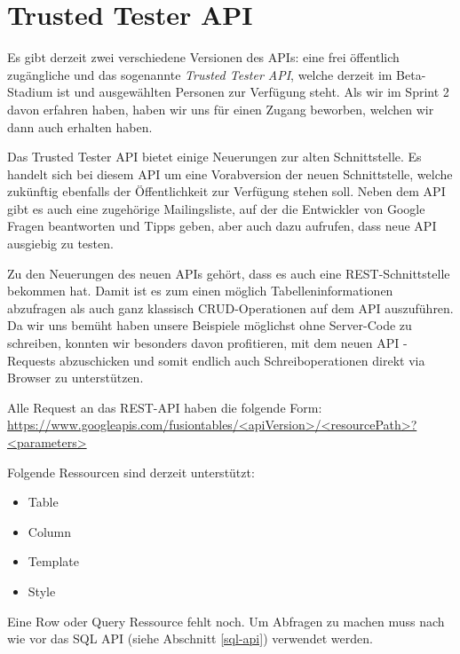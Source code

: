 \section{Trusted Tester API}
\label{trusted-tester-api}
Es gibt derzeit zwei verschiedene Versionen des APIs: eine frei öffentlich zugängliche und das sogenannte \emph{Trusted Tester API}, welche derzeit im Beta-Stadium ist und ausgewählten Personen zur Verfügung steht. Als wir im Sprint 2 davon erfahren haben, haben wir uns für einen Zugang beworben, welchen wir dann auch erhalten haben.

Das Trusted Tester API bietet einige Neuerungen zur alten Schnittstelle. Es handelt sich bei diesem API um eine Vorabversion der neuen Schnittstelle, welche zukünftig ebenfalls der Öffentlichkeit zur Verfügung stehen soll. Neben dem API gibt es auch eine zugehörige Mailingsliste, auf der die Entwickler von Google Fragen beantworten und Tipps geben, aber auch dazu aufrufen, dass neue API ausgiebig zu testen.

Zu den Neuerungen des neuen APIs gehört, dass es auch eine \gls{REST}-Schnittstelle bekommen hat. Damit ist es zum einen möglich Tabelleninformationen abzufragen als auch ganz klassisch CRUD-Operationen auf dem API auszuführen. Da wir uns bemüht haben unsere Beispiele möglichst ohne Server-Code zu schreiben, konnten wir besonders davon profitieren, mit dem neuen API -Requests abzuschicken und somit endlich auch Schreiboperationen direkt via Browser zu unterstützen. 

Alle Request an das \gls{REST}-API haben die folgende Form: \\
\url{https://www.googleapis.com/fusiontables/<apiVersion>/<resourcePath>?<parameters>}

Folgende Ressourcen sind derzeit unterstützt:
\begin{itemize}
	\item Table
	\item Column
	\item Template
	\item Style
\end{itemize}

Eine Row oder Query Ressource fehlt noch. Um Abfragen zu machen muss nach wie vor das SQL API (siehe Abschnitt \ref{sql-api}) verwendet werden.

